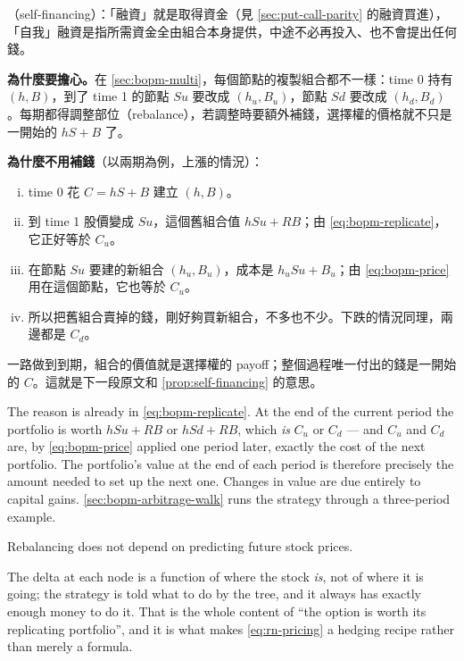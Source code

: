 \suppstart
\begin{remark}
	（self-financing）：「融資」就是取得資金（見 \autoref{sec:put-call-parity} 的融資買進），「自我」融資是指所需資金全由組合本身提供，中途不必再投入、也不會提出任何錢。

	\textbf{為什麼要擔心。}在 \autoref{sec:bopm-multi}，每個節點的複製組合都不一樣：time 0 持有 $(h,B)$，到了 time 1 的節點 $Su$ 要改成 $(h_{u},B_{u})$，節點 $Sd$ 要改成 $(h_{d},B_{d})$。每期都得調整部位（rebalance），若調整時要額外補錢，選擇權的價格就不只是一開始的 $hS+B$ 了。

	\textbf{為什麼不用補錢}（以兩期為例，上漲的情況）：
	\begin{enumerate}[(i),nosep]
		\item time 0 花 $C=hS+B$ 建立 $(h,B)$。
		\item 到 time 1 股價變成 $Su$，這個舊組合值 $hSu+RB$；由 \eqref{eq:bopm-replicate}，它正好等於 $C_{u}$。
		\item 在節點 $Su$ 要建的新組合 $(h_{u},B_{u})$，成本是 $h_{u}Su+B_{u}$；由 \eqref{eq:bopm-price} 用在這個節點，它也等於 $C_{u}$。
		\item 所以把舊組合賣掉的錢，剛好夠買新組合，不多也不少。下跌的情況同理，兩邊都是 $C_{d}$。
	\end{enumerate}
	一路做到到期，組合的價值就是選擇權的 payoff；整個過程唯一付出的錢是一開始的 $C$。這就是下一段原文和 \autoref{prop:self-financing} 的意思。
\end{remark}
\suppend

\suppstart
The reason is already in \eqref{eq:bopm-replicate}.
At the end of the current period the portfolio is worth $hSu+RB$ or $hSd+RB$, which \emph{is} $C_{u}$ or $C_{d}$ --- and $C_{u}$ and $C_{d}$ are, by \eqref{eq:bopm-price} applied one period later, exactly the cost of the next portfolio.
\suppend
The portfolio's value at the end of each period is therefore precisely the amount needed to set up the next one.
Changes in value are due entirely to capital gains.
\suppstart
\autoref{sec:bopm-arbitrage-walk} runs the strategy through a three-period example.
\suppend

\begin{moral}
	Rebalancing does not depend on predicting future stock prices.
\end{moral}

\suppstart
\begin{moral}
	The delta at each node is a function of where the stock \emph{is}, not of where it is going; the strategy is told what to do by the tree, and it always has exactly enough money to do it.
	That is the whole content of ``the option is worth its replicating portfolio'', and it is what makes \eqref{eq:rn-pricing} a hedging recipe rather than merely a formula.
\end{moral}
\suppend
